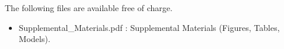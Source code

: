\documentclass[journal=esthag,manuscript=article]{achemso}
\begin{document}

\begin{suppinfo}
The following files are available free of charge.
\begin{itemize}
  \item Supplemental\_Materials.pdf : Supplemental Materials (Figures, Tables, Models).
\end{itemize}
\end{suppinfo}
%
%



\end{document}
